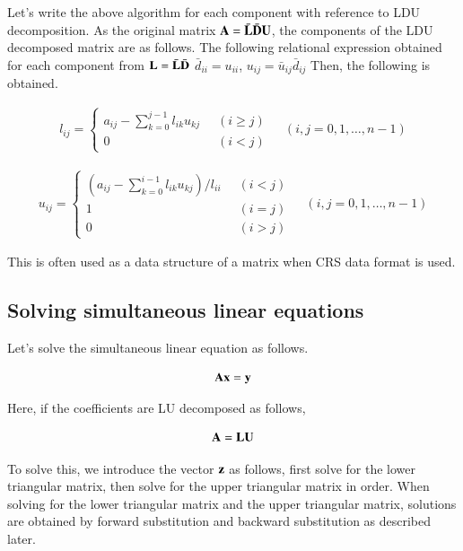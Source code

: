 Let's write the above algorithm for each component with reference to LDU decomposition. As the original matrix $\mathbf{A}=\bar{\mathbf{L}}\bar{\mathbf{D}}\mathbf{U}$, the components of the LDU decomposed matrix are as follows. The following relational expression obtained for each component from $\mathbf{L} = \bar{\mathbf{L}}\bar{\mathbf{D}}$
$\bar{d}_{ii} = u_{ii}$, $u_{ij} = \bar{u}_{ij}\bar{d}_{ij}$
Then, the following is obtained.

\begin{eqnarray}
l_{ij} = \left\{\begin{array}{ll}
a_{ij} - \sum_{k=0}^{j-1} l_{ik} u_{kj}\;\; &  (i\ge j)\\
0 & (i<j)\end{array}\right.\;\;\;\; (i,j=0,1,\ldots,n-1)
\end{eqnarray}


\begin{eqnarray}
u_{ij} = \left\{\begin{array}{ll}
\left(a_{ij} - \sum_{k=0}^{i-1} l_{ik} u_{kj}\right)/l_{ii}\;\; & (i< j)\\
1 & (i=j) \\
0 & (i>j)\end{array}\right.\;\;\;\; (i,j=0,1,\ldots,n-1)
\end{eqnarray}

This is often used as a data structure of a matrix when CRS data format is used.

\subsection{Solving simultaneous linear equations}

Let's solve the simultaneous linear equation as follows.

\begin{equation}
\mathbf{A}\mathbf{x} = \mathbf{y}
\end{equation}

Here, if the coefficients are LU decomposed as follows,

\begin{equation}
\mathbf{A} = \mathbf{L}\mathbf{U}
\end{equation}

To solve this, we introduce the vector $\mathbf{z}$ as follows, first solve for the lower triangular matrix, then solve for the upper triangular matrix in order. When solving for the lower triangular matrix and the upper triangular matrix, solutions are obtained by forward substitution and backward substitution as described later.

